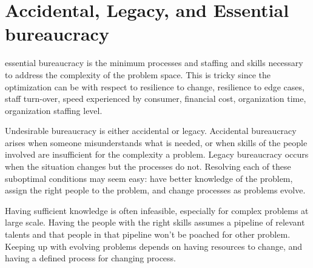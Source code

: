 \section{Accidental, Legacy, and Essential bureaucracy}
\gls{essential bureaucracy} is the minimum processes and staffing and skills necessary to address the complexity of the problem space. This is tricky since the optimization can be with respect to resilience to change, resilience to edge cases, staff turn-over, speed experienced by consumer, financial cost, organization time, organization staffing level.

Undesirable bureaucracy is either accidental or legacy. Accidental bureaucracy arises when someone misunderstands what is needed, or when skills of the people involved are insufficient for the complexity a problem. Legacy bureaucracy occurs when the situation changes but the processes do not. Resolving each of these suboptimal conditions may seem easy: have better knowledge of the problem, assign the right people to the problem, and change processes as problems evolve. 

Having sufficient knowledge is often infeasible, especially for complex problems at large scale. Having the people with the right skills assumes a pipeline of relevant talents and that people in that pipeline won't be poached for other problem. Keeping up with evolving problems depends on having resources to change, and having a defined process for changing process. 